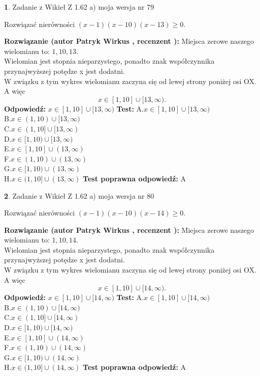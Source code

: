 \documentclass[12pt, a4paper]{article}
\theoremstyle{definition} %
\newtheorem{zad}{}
\newcommand{\zadStart}[1]{\begin{zad}#1\newline}
\newcommand{\zadStop}{\end{zad}}
\newcommand{\rozwStart}[2]{\noindent \textbf{Rozwiązanie (autor #1 , recenzent #2): }\newline}
\newcommand{\rozwStop}{\newline}
\newcommand{\odpStart}{\noindent \textbf{Odpowiedź:}\newline}
\newcommand{\odpStop}{\newline}
\newcommand{\testStart}{\noindent \textbf{Test:}\newline}
\newcommand{\testStop}{\newline}
\newcommand{\kluczStart}{\noindent \textbf{Test poprawna odpowiedź:}\newline}
\newcommand{\kluczStop}{\newline}
\begin{document}
\zadStart{Zadanie z Wikieł Z 1.62 a) moja wersja nr 79}

Rozwiązać nierówności $(x-1)(x-10)(x-13)\ge0$.
\zadStop
\rozwStart{Patryk Wirkus}{}
Miejsca zerowe naszego wielomianu to: $1, 10, 13$.\\
Wielomian jest stopnia nieparzystego, ponadto znak współczynnika przy\linebreak najwyższej potędze x jest dodatni.\\ W związku z tym wykres wielomianu zaczyna się od lewej strony poniżej osi OX. A więc $$x \in [1,10] \cup [13,\infty).$$
\rozwStop
\odpStart
$x \in [1,10] \cup [13,\infty)$
\odpStop
\testStart
A.$x \in [1,10] \cup [13,\infty)$\\
B.$x \in (1,10) \cup [13,\infty)$\\
C.$x \in (1,10] \cup [13,\infty)$\\
D.$x \in [1,10) \cup [13,\infty)$\\
E.$x \in [1,10] \cup (13,\infty)$\\
F.$x \in (1,10) \cup (13,\infty)$\\
G.$x \in [1,10) \cup (13,\infty)$\\
H.$x \in (1,10] \cup (13,\infty)$
\testStop
\kluczStart
A
\kluczStop



\zadStart{Zadanie z Wikieł Z 1.62 a) moja wersja nr 80}

Rozwiązać nierówności $(x-1)(x-10)(x-14)\ge0$.
\zadStop
\rozwStart{Patryk Wirkus}{}
Miejsca zerowe naszego wielomianu to: $1, 10, 14$.\\
Wielomian jest stopnia nieparzystego, ponadto znak współczynnika przy\linebreak najwyższej potędze x jest dodatni.\\ W związku z tym wykres wielomianu zaczyna się od lewej strony poniżej osi OX. A więc $$x \in [1,10] \cup [14,\infty).$$
\rozwStop
\odpStart
$x \in [1,10] \cup [14,\infty)$
\odpStop
\testStart
A.$x \in [1,10] \cup [14,\infty)$\\
B.$x \in (1,10) \cup [14,\infty)$\\
C.$x \in (1,10] \cup [14,\infty)$\\
D.$x \in [1,10) \cup [14,\infty)$\\
E.$x \in [1,10] \cup (14,\infty)$\\
F.$x \in (1,10) \cup (14,\infty)$\\
G.$x \in [1,10) \cup (14,\infty)$\\
H.$x \in (1,10] \cup (14,\infty)$
\testStop
\kluczStart
A
\kluczStop
\end{document}
